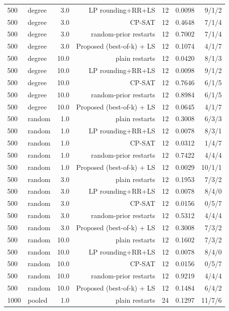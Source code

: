 \begin{table}[t]
\begin{tabular}{llrrrrr}
500 & degree & 3.0 & LP rounding+RR+LS & 12 & 0.0098 & 9/1/2 \\
500 & degree & 3.0 & CP-SAT & 12 & 0.4648 & 7/1/4 \\
500 & degree & 3.0 & random-prior restarts & 12 & 0.7002 & 7/1/4 \\
500 & degree & 3.0 & Proposed (best-of-k) + LS & 12 & 0.1074 & 4/1/7 \\
500 & degree & 10.0 & plain restarts & 12 & 0.0420 & 8/1/3 \\
500 & degree & 10.0 & LP rounding+RR+LS & 12 & 0.0098 & 9/1/2 \\
500 & degree & 10.0 & CP-SAT & 12 & 0.7646 & 6/1/5 \\
500 & degree & 10.0 & random-prior restarts & 12 & 0.8984 & 6/1/5 \\
500 & degree & 10.0 & Proposed (best-of-k) + LS & 12 & 0.0645 & 4/1/7 \\
500 & random & 1.0 & plain restarts & 12 & 0.3008 & 6/3/3 \\
500 & random & 1.0 & LP rounding+RR+LS & 12 & 0.0078 & 8/3/1 \\
500 & random & 1.0 & CP-SAT & 12 & 0.0312 & 1/4/7 \\
500 & random & 1.0 & random-prior restarts & 12 & 0.7422 & 4/4/4 \\
500 & random & 1.0 & Proposed (best-of-k) + LS & 12 & 0.0029 & 10/1/1 \\
500 & random & 3.0 & plain restarts & 12 & 0.1953 & 7/3/2 \\
500 & random & 3.0 & LP rounding+RR+LS & 12 & 0.0078 & 8/4/0 \\
500 & random & 3.0 & CP-SAT & 12 & 0.0156 & 0/5/7 \\
500 & random & 3.0 & random-prior restarts & 12 & 0.5312 & 4/4/4 \\
500 & random & 3.0 & Proposed (best-of-k) + LS & 12 & 0.3008 & 7/3/2 \\
500 & random & 10.0 & plain restarts & 12 & 0.1602 & 7/3/2 \\
500 & random & 10.0 & LP rounding+RR+LS & 12 & 0.0078 & 8/4/0 \\
500 & random & 10.0 & CP-SAT & 12 & 0.0156 & 0/5/7 \\
500 & random & 10.0 & random-prior restarts & 12 & 0.9219 & 4/4/4 \\
500 & random & 10.0 & Proposed (best-of-k) + LS & 12 & 0.1484 & 6/4/2 \\
1000 & pooled & 1.0 & plain restarts & 24 & 0.1297 & 11/7/6 \\

\end{tabular}
\end{table}

